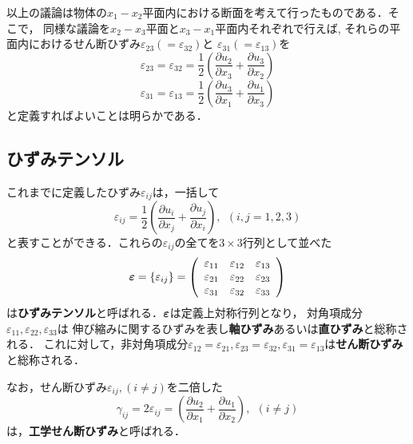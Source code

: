 \documentclass[10pt,a4j]{jbook}
\begin{document}
以上の議論は物体の$x_1-x_2$平面内における断面を考えて行ったものである．そこで，
同様な議論を$x_2-x_3$平面と$x_3-x_1$平面内それぞれで行えば,
それらの平面内におけるせん断ひずみ$\varepsilon_{23}(=\varepsilon_{32})$と
$\varepsilon_{31}(=\varepsilon_{13})$を
\begin{equation}
	\varepsilon_{23}=
	\varepsilon_{32}=
	\frac{1}{2}
	\left(
	\frac{\partial u_2}{\partial x_3}
	+
	\frac{\partial u_3}{\partial x_2}
	\right)
	\label{eqn:def_e23}
\end{equation}
\begin{equation}
	\varepsilon_{31}=
	\varepsilon_{13}=
	\frac{1}{2}
	\left(
	\frac{\partial u_3}{\partial x_1}
	+
	\frac{\partial u_1}{\partial x_3}
	\right)
	\label{eqn:def_e31}
\end{equation}
と定義すればよいことは明らかである．
\subsection{ひずみテンソル}
これまでに定義したひずみ$\varepsilon_{ij}$は，一括して
\begin{equation}
	\varepsilon_{ij}=\frac{1}{2}
	\left(
	\frac{\partial u_i}{\partial x_j}
	+
	\frac{\partial u_j}{\partial x_i}
	\right), \ \ (i,j=1,2,3)
	\label{eqn:def_eij}
\end{equation}
と表すことができる．これらの$\varepsilon_{ij}$の全てを$3\times 3$行列として並べた
\begin{equation}
	\mbox{\boldmath $\varepsilon$}=\left\{ \varepsilon_{ij}\right\}
	=\left(
	\begin{array}{ccc}
		\varepsilon_{11} & \varepsilon_{12} & \varepsilon_{13}\\
		\varepsilon_{21} & \varepsilon_{22} & \varepsilon_{23}\\
		\varepsilon_{31} & \varepsilon_{32} & \varepsilon_{33}
	\end{array}
	\right)
	\label{eqn:def_emat}
\end{equation}
は{\bf ひずみテンソル}と呼ばれる．$\mbox{\boldmath $\varepsilon$}$は定義上対称行列となり，
対角項成分$\varepsilon_{11},\varepsilon_{22},\varepsilon_{33}$は
伸び縮みに関するひずみを表し{\bf 軸ひずみ}あるいは{\bf 直ひずみ}と総称される．
これに対して，非対角項成分$\varepsilon_{12}=\varepsilon_{21},\varepsilon_{23}=\varepsilon_{32},
\varepsilon_{31}=\varepsilon_{13}$は{\bf せん断ひずみ}と総称される．

なお，せん断ひずみ$\varepsilon_{ij},(i\neq j)$を二倍した
\begin{equation}
	\gamma_{ij}=2\varepsilon_{ij}
	=
	\left(
	\frac{\partial u_2}{\partial x_1}
	+
	\frac{\partial u_1}{\partial x_2}
	\right), \ \ (i\neq j)
	\label{eqn:def_g12}
\end{equation}
は，{\bf 工学せん断ひずみ}と呼ばれる．
\end{document}
